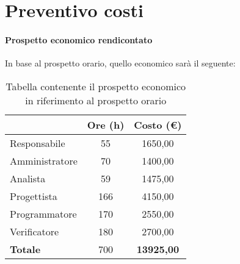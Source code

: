 \section{Preventivo costi}\label{section:preventivo_costi}

\paragraph{Prospetto economico rendicontato}
In base al prospetto orario, quello economico sarà il seguente:

\begin{table}[H]
  \centering
  \renewcommand{\arraystretch}{1.8}
	\begin{tabular}{l|cc}
		\rowcolor[HTML]{125E28}
		\multicolumn{1}{c}{\color[HTML]{FFFFFF}\textbf{Ruolo}}
		& \color[HTML]{FFFFFF}\textbf{Ore (h)}
		& \color[HTML]{FFFFFF}\textbf{Costo (€)} \\
		\hline
		Responsabile		& 55	& 1650,00 \\
		Amministratore	& 70  & 1400,00 \\
		Analista        & 59  & 1475,00 \\
		Progettista     & 166 & 4150,00 \\
		Programmatore 	& 170 & 2550,00	\\
		Verificatore		& 180 & 2700,00 \\
		\hline
		\rowcolor[HTML]{125E28}
		\color[HTML]{FFFFFF}\textbf{Totale} & \color[HTML]{FFFFFF}700 & \color[HTML]{FFFFFF}\textbf{13925,00}             
	\end{tabular}
	\caption{Tabella contenente il prospetto economico in riferimento al prospetto orario}
\end{table}
